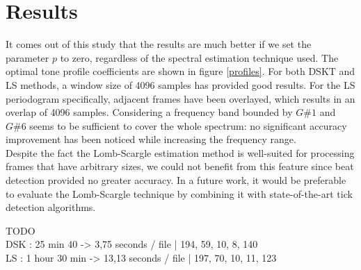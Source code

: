 \documentclass[letterpaper]{article}
\begin{document}
\section{Results}

It comes out of this study that the results are much better if we set the parameter $p$ to zero, regardless of the spectral estimation technique used.
The optimal tone profile coefficients are shown in figure \ref{profiles}. For both DSKT and LS methods, a window size of 4096 samples has provided good results. For the LS periodogram specifically, adjacent frames have been overlayed, which results in an overlap of 4096 samples.
Considering a frequency band bounded by $G\#1$ and $G\#6$ seems to be sufficient to cover the whole spectrum: no significant accuracy improvement has been noticed while increasing the frequency range.\\

Despite the fact the Lomb-Scargle estimation method is well-suited for processing frames that have arbitrary sizes, we could not benefit from this feature since beat detection provided no greater accuracy. In a future work, it would be preferable to evaluate the Lomb-Scargle technique by combining it with state-of-the-art tick detection algorithms.

\begin{table}
\vskip 0.25cm
\caption{Accuracy assessment, according to the raw accuracy and the MIREX index}
\end{table}

TODO\\
DSK : 25 min 40 -> 3,75 seconds / file     | 194, 59, 10, 8, 140 \\
LS : 1 hour 30 min -> 13,13 seconds / file | 197, 70, 10, 11, 123 \\

\footnotesize



\newpage
\end{document}
